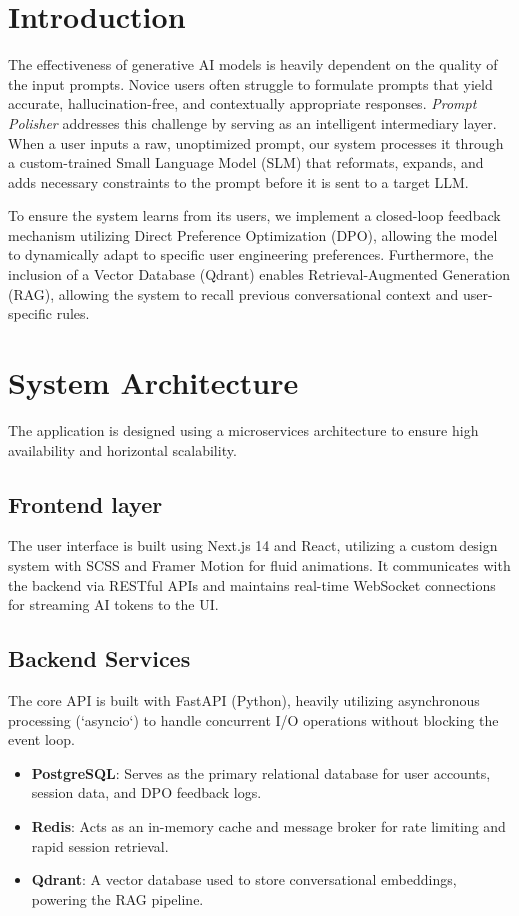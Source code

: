 \documentclass[10pt, conference]{IEEEtran}
\begin{document}
\section{Introduction}
The effectiveness of generative AI models is heavily dependent on the quality of the input prompts. Novice users often struggle to formulate prompts that yield accurate, hallucination-free, and contextually appropriate responses. \textit{Prompt Polisher} addresses this challenge by serving as an intelligent intermediary layer. When a user inputs a raw, unoptimized prompt, our system processes it through a custom-trained Small Language Model (SLM) that reformats, expands, and adds necessary constraints to the prompt before it is sent to a target LLM. 

To ensure the system learns from its users, we implement a closed-loop feedback mechanism utilizing Direct Preference Optimization (DPO), allowing the model to dynamically adapt to specific user engineering preferences. Furthermore, the inclusion of a Vector Database (Qdrant) enables Retrieval-Augmented Generation (RAG), allowing the system to recall previous conversational context and user-specific rules.

\section{System Architecture}
The application is designed using a microservices architecture to ensure high availability and horizontal scalability.

\subsection{Frontend layer}
The user interface is built using Next.js 14 and React, utilizing a custom design system with SCSS and Framer Motion for fluid animations. It communicates with the backend via RESTful APIs and maintains real-time WebSocket connections for streaming AI tokens to the UI.

\subsection{Backend Services}
The core API is built with FastAPI (Python), heavily utilizing asynchronous processing (`asyncio`) to handle concurrent I/O operations without blocking the event loop. 
\begin{itemize}
    \item \textbf{PostgreSQL}: Serves as the primary relational database for user accounts, session data, and DPO feedback logs.
    \item \textbf{Redis}: Acts as an in-memory cache and message broker for rate limiting and rapid session retrieval.
    \item \textbf{Qdrant}: A vector database used to store conversational embeddings, powering the RAG pipeline.
\end{itemize}
\end{document}
